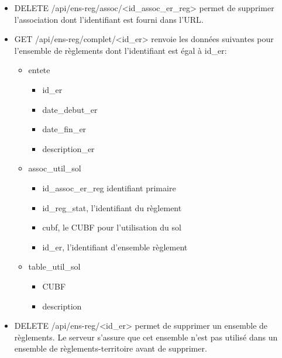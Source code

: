 \begin{itemize}
    \begin{itemize}
        \item id\_reg\_stat, l'identifiant du règlement
        \item cubf, le \ac{CUBF} pour l'utilisation du sol
        \item id\_er, l'identifiant d'ensemble règlement
    \end{itemize}
    \item DELETE /api/ens-reg/assoc/<id\_assoc\_er\_reg> permet de supprimer l'association dont l'identifiant est fourni dans l'\ac{URL}.
    \item GET /api/ens-reg/complet/<id\_er> renvoie  les données suivantes pour l'ensemble de règlements dont l'identifiant est égal à id\_er:
        \begin{itemize}
            \item entete
                \begin{itemize}
                    \item id\_er
                    \item date\_debut\_er
                    \item date\_fin\_er
                    \item description\_er
                \end{itemize}
            \item assoc\_util\_sol
                \begin{itemize}
                    \item id\_assoc\_er\_reg identifiant primaire
                    \item id\_reg\_stat, l'identifiant du règlement
                    \item cubf, le \ac{CUBF} pour l'utilisation du sol
                    \item id\_er, l'identifiant d'ensemble règlement
                \end{itemize}
            \item table\_util\_sol
                \begin{itemize}
                    \item \ac{CUBF}
                    \item description
                \end{itemize}
        \end{itemize}
    \item DELETE /api/ens-reg/<id\_er> permet de supprimer un ensemble de règlements. Le serveur s'assure que cet ensemble n'est pas utilisé dans un ensemble de règlements-territoire avant de supprimer.

\end{itemize}
